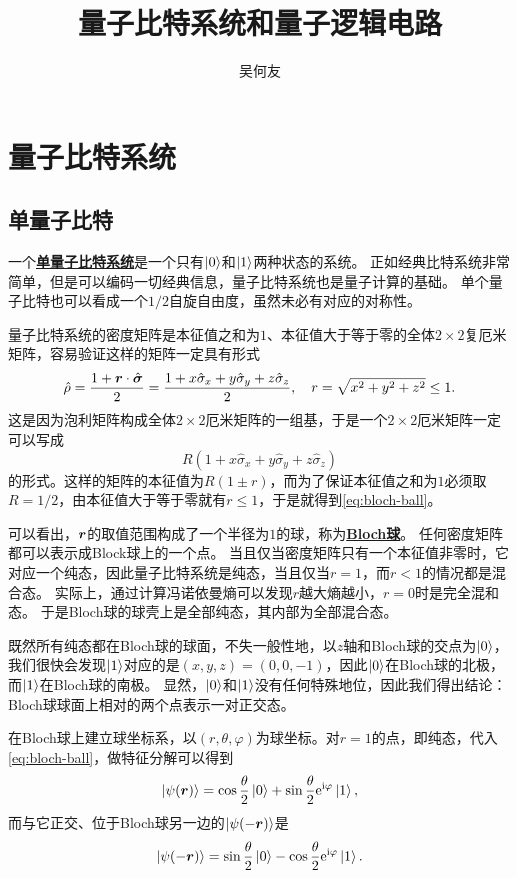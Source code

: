 \documentclass[hyperref, UTF8, a4paper]{ctexart}
\title{量子比特系统和量子逻辑电路}
\author{吴何友}
\newcommand*{\ii}{\mathrm{i}}
\newcommand*{\ee}{\mathrm{e}}
\newcommand*{\concept}[1]{\underline{\textbf{#1}}}
\begin{document}
\maketitle

\section{量子比特系统}

\subsection{单量子比特}

一个\concept{单量子比特系统}是一个只有$\ket{0}$和$\ket{1}$两种状态的系统。
正如经典比特系统非常简单，但是可以编码一切经典信息，量子比特系统也是量子计算的基础。
单个量子比特也可以看成一个$1/2$自旋自由度，虽然未必有对应的对称性。

量子比特系统的密度矩阵是本征值之和为$1$、本征值大于等于零的全体$2 \times 2$复厄米矩阵，容易验证这样的矩阵一定具有形式
\begin{equation}
    \hat{\rho} = \frac{1 + \vb*{r} \cdot \hat{\vb*{\sigma}}}{2} = \frac{1 + x \hat{\sigma}_x + y \hat{\sigma}_y + z \hat{\sigma}_z}{2}, \quad r = \sqrt{x^2+y^2+z^2} \leq 1.
    \label{eq:bloch-ball}
\end{equation}
这是因为泡利矩阵构成全体$2\times 2$厄米矩阵的一组基，于是一个$2\times 2$厄米矩阵一定可以写成
\[
    R(1 + x \hat{\sigma}_x + y \hat{\sigma}_y + z \hat{\sigma}_z)
\]
的形式。这样的矩阵的本征值为$R(1 \pm r)$，而为了保证本征值之和为$1$必须取$R=1/2$，由本征值大于等于零就有$r\leq 1$，于是就得到\eqref{eq:bloch-ball}。

可以看出，$\vb*{r}$的取值范围构成了一个半径为$1$的球，称为\concept{Bloch球}。
任何密度矩阵都可以表示成Block球上的一个点。
当且仅当密度矩阵只有一个本征值非零时，它对应一个纯态，因此量子比特系统是纯态，当且仅当$r=1$，而$r<1$的情况都是混合态。
实际上，通过计算冯诺依曼熵可以发现$r$越大熵越小，$r=0$时是完全混和态。
于是Bloch球的球壳上是全部纯态，其内部为全部混合态。

既然所有纯态都在Bloch球的球面，不失一般性地，以$z$轴和Bloch球的交点为$\ket{0}$，我们很快会发现$\ket{1}$对应的是$(x, y, z) = (0, 0, -1)$，因此$\ket{0}$在Bloch球的北极，而$\ket{1}$在Bloch球的南极。
显然，$\ket{0}$和$\ket{1}$没有任何特殊地位，因此我们得出结论：Bloch球球面上相对的两个点表示一对正交态。

在Bloch球上建立球坐标系，以$(r, \theta, \varphi)$为球坐标。对$r=1$的点，即纯态，代入\eqref{eq:bloch-ball}，做特征分解可以得到
\begin{equation}
    \ket{\psi(\vb*{r})} = \cos \frac{\theta}{2} \ket{0} + \sin \frac{\theta}{2} \ee^{\ii \varphi} \ket{1},
    \label{eq:state-on-ball}
\end{equation}
而与它正交、位于Bloch球另一边的$\ket{\psi(-\vb*{r})}$是
\begin{equation}
    \ket{\psi(-\vb*{r})} = \sin \frac{\theta}{2} \ket{0} - \cos \frac{\theta}{2} \ee^{\ii \varphi} \ket{1}.
\end{equation}
\end{document}

